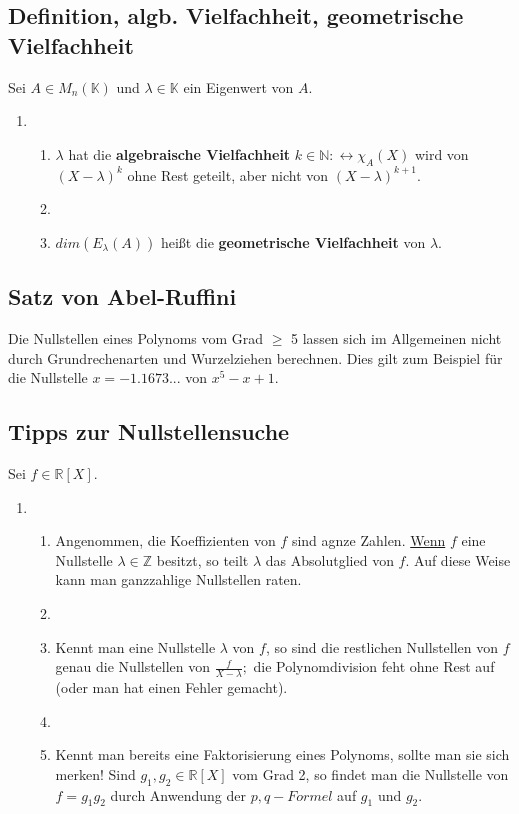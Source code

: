 \documentclass[titlepage]{article}
\newcommand{\K}{\mathbb{K}}
\newcommand{\N}{\mathbb{N}}
\newcommand{\R}{\mathbb{R}}
\newcommand{\1}{\mathbb{1}}
\newcommand{\0}{\mathbb{0}}
\newcommand{\Z}{\mathbb{Z}}
\begin{document}
			\subsection{Definition, algb. Vielfachheit, geometrische Vielfachheit}
				Sei $A\in M_n(\K)$ und $\lambda\in\K$ ein Eigenwert von $A$.
				\begin{enumerate}
					\item []
					\begin{enumerate}
						\item $\lambda$ hat die \textbf{algebraische Vielfachheit} $k\in\N:\leftrightarrow\chi_A(X)$ wird von $(X-\lambda)^k$ ohne Rest geteilt, aber nicht von $(X-\lambda)^{k+1}.$
						\item []
						\item $dim(E_{\lambda}(A))$ heißt die \textbf{geometrische Vielfachheit} von $\lambda$.
					\end{enumerate}
				\end{enumerate}
			\subsection{Satz von Abel-Ruffini}
				Die Nullstellen eines Polynoms vom Grad $\ge$ 5 lassen sich im Allgemeinen nicht durch Grundrechenarten und Wurzelziehen berechnen. Dies gilt zum Beispiel für die Nullstelle $x=-1.1673...$ von $x^5-x+1$.
			\subsection{Tipps zur Nullstellensuche}
				Sei $f\in\R[X].$
				\begin{enumerate}
					\item []
					\begin{enumerate}
						\item Angenommen, die Koeffizienten von $f$ sind agnze Zahlen. \underline{Wenn} $f$ eine Nullstelle $\lambda\in\Z$ besitzt, so teilt $\lambda$ das Absolutglied von $f$. Auf diese Weise kann man ganzzahlige Nullstellen raten.
						\item []
						\item Kennt man eine Nullstelle $\lambda$ von $f$, so sind die restlichen Nullstellen von $f$ genau die Nullstellen von $\frac{f}{X-\lambda};$ die Polynomdivision feht ohne Rest auf (oder man hat einen Fehler gemacht).
						\item []
						\item Kennt man bereits eine Faktorisierung eines Polynoms, sollte man sie sich merken! Sind $g_1,g_2\in\R[X]$ vom Grad 2, so findet man die Nullstelle von $f=g_1g_2$ durch Anwendung der $p,q-Formel$ auf $g_1$ und $g_2$.
					\end{enumerate}					
				\end{enumerate}
\end{document}
